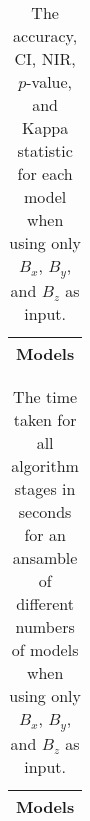 \begin{table}[!ht]
	\centering
	\begin{tabular}{|c|}
		\hline
		Models \\ \hline
	\end{tabular}
	\caption{The accuracy, CI, NIR, $p$-value, and Kappa statistic for each model when using only $B_{x}$, $B_{y}$, and $B_{z}$ as input.}
	\label{tab:time:ansamble:coord}
\end{table}

\begin{table}[!ht]
	\centering
	\begin{tabular}{|c|}
		\hline
		Models \\ \hline
	\end{tabular}
	\caption{The time taken for all algorithm stages in seconds for an ansamble of different numbers of models when using only $B_{x}$, $B_{y}$, and $B_{z}$ as input.}
	\label{tab:time:ansamble:reverse:coord}
\end{table}
